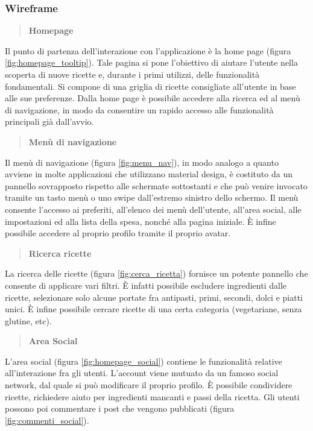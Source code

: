 \subsubsection{Wireframe}

\begin{quote}
 \textbf{Homepage}
\end{quote}
Il punto di partenza dell'interazione con l'applicazione è la home
page (figura \ref{fig:homepage_tooltip}). Tale pagina
si pone l'obiettivo di aiutare l'utente nella scoperta di nuove ricette e, durante
i primi utilizzi, delle funzionalità fondamentali. Si compone di una griglia di ricette
consigliate all'utente in base alle sue preferenze.
Dalla home page è possibile accedere alla ricerca ed al menù di navigazione, in modo da consentire
un rapido accesso alle funzionalità principali già dall'avvio.

\begin{quote}
 \textbf{Menù di navigazione}
\end{quote}
Il menù di navigazione (figura \ref{fig:menu_nav}), in modo analogo a quanto avviene in molte applicazioni che utilizzano material design,
è costituto da un pannello sovrapposto rispetto alle schermate sottostanti e che può venire invocato tramite
un tasto menù o uno swipe dall'estremo sinistro dello schermo. Il menù consente l'accesso ai preferiti, all'elenco dei
menù dell'utente, all'area social, alle impostazioni ed alla lista della spesa, nonché alla pagina iniziale. È infine
possibile accedere al proprio profilo tramite il proprio avatar.

\begin{quote}
 \textbf{Ricerca ricette}
\end{quote}
La ricerca delle ricette (figura \ref{fig:cerca_ricetta}) fornisce un potente pannello che consente di applicare vari filtri.
È infatti possibile escludere ingredienti dalle ricette, selezionare solo alcune portate fra antipasti, primi,
secondi, dolci e piatti unici. È infine possibile cercare ricette di una certa categoria (vegetariane, senza glutine, etc).

\begin{quote}
 \textbf{Area Social}
\end{quote}
L'area social (figura \ref{fig:homepage_social}) contiene le funzionalità relative all'interazione fra gli utenti. L'account viene
mutuato da un famoso social network, dal quale si può modificare il proprio profilo.
È possibile condividere ricette, richiedere aiuto per ingredienti mancanti e passi
della ricetta. Gli utenti possono poi commentare i post che vengono
pubblicati (figura \ref{fig:commenti_social}).


